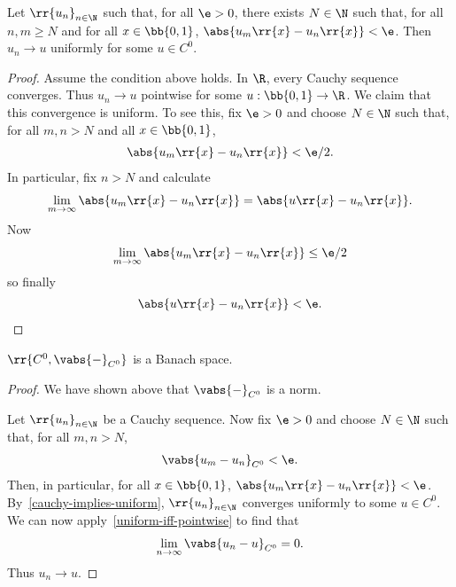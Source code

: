\documentclass{article}
\begin{document}
\begin{lemma} \label{cauchy-implies-uniform}
  Let $ \rr{u_n}_{n\in\N}$ such that, for all $\e>0$, there exists $N\in\N$ such that, for all $n,m\geq N$ and for all
  $x\in \bb{ 0,1 }$, $\abs{u_m \rr{ x } - u_n \rr{ x }} < \e$. Then $u_n\to u$ uniformly for some $u\in C^0$.
  \begin{proof}
    Assume the condition above holds. In $\R$, every Cauchy sequence converges. Thus $u_n\to u$
    pointwise for some $u: \bb{ 0,1 }\to \R$. We claim that this convergence is uniform.
    To see this, fix $\e > 0$ and choose $N\in\N$ such that, for all $m,n>N$ and all $x\in \bb{ 0,1 }$,
    \begin{align*}
      \abs{u_m \rr{ x } - u_n \rr{ x }} < \e/2.
    \end{align*}
    In particular, fix $n>N$ and calculate
    \begin{align*}
      \lim_{m\to\infty} \abs{ u_m \rr{ x } - u_n \rr{ x }} = \abs{ u \rr{ x } - u_n \rr{ x } }.
    \end{align*}
    Now
    \begin{align*}
      \lim_{m\to\infty} \abs{ u_m \rr{ x } - u_n \rr{ x }} \leq \e / 2
    \end{align*}
    so finally
    \begin{align*}
      \abs{u \rr{ x } - u_n \rr{ x }} < \e.
    \end{align*}

  \end{proof}
\end{lemma}

\begin{claim*}[7]
  $ \rr{ C^0, \vabs{-}_{C^0} }$ is a Banach space.
  \begin{proof}
    We have shown above that $\vabs{-}_{C^0}$ is a norm.

    Let $ \rr{u_n}_{n\in\N}$ be a Cauchy sequence. Now fix $\e>0$ and choose $N\in\N$
    such that, for all $m,n>N$,
    \begin{align*}
      \vabs{u_m - u_n}_{C^0}<\e.
    \end{align*}
    Then, in particular, for all $x\in \bb{ 0,1 }$, $\abs{u_m \rr{ x } - u_n \rr{ x }}<\e$.
    By~\ref{cauchy-implies-uniform}, $ \rr{u_n}_{n\in\N}$ converges uniformly to some $u\in C^0$.
    We can now apply~\ref{uniform-iff-pointwise} to find that
    \begin{align*}
      \lim_{n\to\infty} \vabs{u_n-u}_{C^0} = 0.
    \end{align*}
    Thus $u_n\to u$.
  \end{proof}
\end{claim*}
\end{document}
